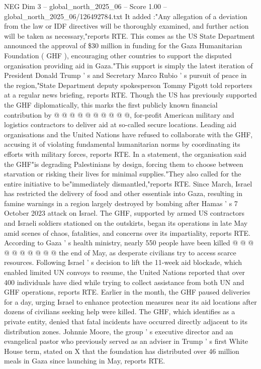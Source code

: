 \begin{textsample}{NEG Dim 3 – global\_north\_2025\_06 – Score 1.00 – global\_north\_2025\_06/126492784.txt}
It added :"Any allegation of a deviation from the law or IDF directives will be thoroughly examined, and further action will be taken as necessary,"reports RTE.
This comes as the US State Department announced the approval of \$30 million in funding for the Gaza Humanitarian Foundation ( GHF ), encouraging other countries to support the disputed organisation providing aid in Gaza."This support is simply the latest iteration of President Donald Trump ' s and Secretary Marco Rubio ' s pursuit of peace in the region,"State Department deputy spokesperson Tommy Pigott told reporters at a regular news briefing, reports RTE.
Though the US has previously supported the GHF diplomatically, this marks the first publicly known financial contribution by @ @ @ @ @ @ @ @ @ @, for-profit American military and logistics contractors to deliver aid at so-called secure locations.
Leading aid organisations and the United Nations have refused to collaborate with the GHF, accusing it of violating fundamental humanitarian norms by coordinating its efforts with military forces, reports RTE.
In a statement, the organisation said the GHF"is degrading Palestinians by design, forcing them to choose between starvation or risking their lives for minimal supplies."They also called for the entire initiative to be"immediately dismantled,"reports RTE.
Since March, Israel has restricted the delivery of food and other essentials into Gaza, resulting in famine warnings in a region largely destroyed by bombing after Hamas ' s 7 October 2023 attack on Israel.
The GHF, supported by armed US contractors and Israeli soldiers stationed on the outskirts, began its operations in late May amid scenes of chaos, fatalities, and concerns over its impartiality, reports RTE.
According to Gaza ' s health ministry, nearly 550 people have been killed @ @ @ @ @ @ @ @ @ @ the end of May, as desperate civilians try to access scarce resources.
Following Israel ' s decision to lift the 11-week aid blockade, which enabled limited UN convoys to resume, the United Nations reported that over 400 individuals have died while trying to collect assistance from both UN and GHF operations, reports RTE.
Earlier in the month, the GHF paused deliveries for a day, urging Israel to enhance protection measures near its aid locations after dozens of civilians seeking help were killed.
The GHF, which identifies as a private entity, denied that fatal incidents have occurred directly adjacent to its distribution zones.
Johnnie Moore, the group ' s executive director and an evangelical pastor who previously served as an adviser in Trump ' s first White House term, stated on X that the foundation has distributed over 46 million meals in Gaza since launching in May, reports RTE.

\end{textsample}
